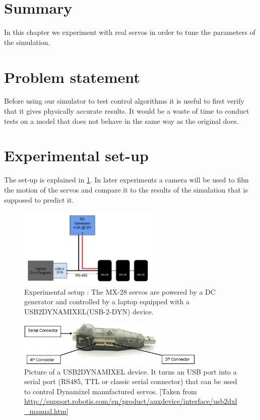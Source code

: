 \section*{Summary}
In this chapter we experiment with real servos in order to tune the parameters of the simulation.

\section{Problem statement}
Before using our simulator to test control algorithms it is useful to first verify that it gives physically accurate results. It would be a waste of time to conduct tests on a model that does not behave in the same way as the original does.

\section{Experimental set-up}
The set-up is explained in \cref{fig:exp_setup}. In later experiments a camera will be used to film the motion of the servos and compare it to the results of the simulation that is supposed to predict it.

\begin{figure}[htp]
\center
\includegraphics[width=0.6\textwidth]{figures/exp_setup}
\caption[Experimental setup]{Experimental setup : The MX-28 servos are powered by a DC generator and controlled by a laptop equipped with a USB2DYNAMIXEL(USB-2-DYN) device.}
\label{fig:exp_setup}
\end{figure}

\begin{figure}[htp]
\center
    \includegraphics[width = 0.8\textwidth]{figures/u2d}
    \caption[USB2DYNAMIXEL]{Picture of a USB2DYNAMIXEL device. It turns an USB port into a serial port (RS485, TTL or classic serial connector) that can be used to control Dynamixel manufactured servos. [Taken from \url{http://support.robotis.com/en/product/auxdevice/interface/usb2dxl_manual.htm}]}
    \label{fig:usb2dyn}
\end{figure}

